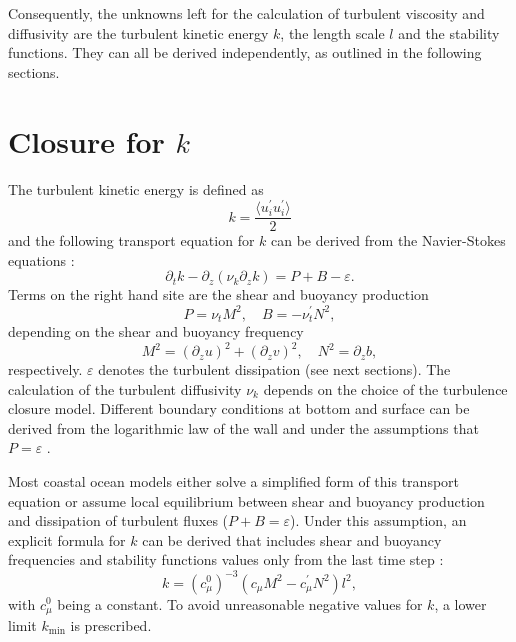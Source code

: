 Consequently, the unknowns left for the calculation of turbulent viscosity and 
diffusivity are the turbulent kinetic energy $k$, the length scale $l$ and the 
stability functions. They can all be derived independently, as outlined in the 
following sections.

\section{Closure for $k$ }\label{kclosure}

The turbulent kinetic energy is defined as
\begin{equation}
 \label{TKE}
 k = \frac{\langle u_i^\prime u_i^\prime \rangle}{2}
\end{equation}
and the following transport equation for $k$ can be derived from the 
Navier-Stokes equations \citep[][]{Rodi1980}:
\begin{equation}
 \label{transpk}
 \partial_t k - \partial_z (\nu_k \partial_z k) = P + B -\varepsilon.
\end{equation}
Terms on the right hand site are the shear and buoyancy production
\begin{equation}
 \label{PandB}
 P = \nu_t M^2, \quad B=-\nu^\prime_t N^2, 
\end{equation}
depending on the shear and buoyancy frequency
\begin{equation}
 \label{MundN}
 M^2 = (\partial_z u)^2 + (\partial_z v)^2, \quad N^2 = \partial_z b,
\end{equation}
respectively. $\varepsilon$ denotes the turbulent dissipation (see next 
sections). The calculation of the turbulent diffusivity $\nu_k$ depends on the 
choice of the turbulence closure model. Different boundary conditions at bottom 
and surface can be derived from the logarithmic law of the wall and under the 
assumptions that $P = \varepsilon$ \citep[][]{gotm1999}.

Most coastal ocean models either solve a simplified form of this transport 
equation or assume local equilibrium between shear and buoyancy production and 
dissipation of turbulent fluxes ($P+B=\varepsilon$). Under this assumption, an 
explicit formula for $k$ can be derived that includes shear and buoyancy 
frequencies and stability functions values only from the last time step 
\citep[][]{UmlaufBurchard2005a}:
\begin{equation}
 \label{explick}
 k = (c_\mu^0)^{-3} (c_\mu M^2 - c_\mu^\prime N^2) l^2,
\end{equation}
 with $c_\mu^0$ being a constant. To avoid unreasonable negative values for 
$k$, a lower limit $k_{\min}$ is prescribed.

